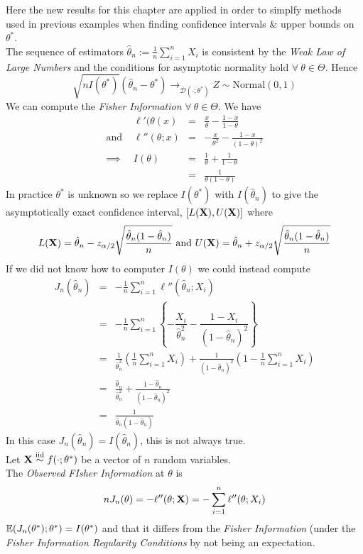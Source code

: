 \documentclass[11pt,a4paper]{article}
\begin{document}
Here the new results for this chapter are applied in order to simplfy methods used in previous examples when finding confidence intervals \& upper bounds on $\theta^*$.\\
The sequence of estimators $\hat{\theta}_n:=\frac{1}{n}\sum_{i=1}^nX_i$ is consistent by the \textit{Weak Law of Large Numbers} and the conditions for asymptotic normality hold $\forall\ \theta\in\Theta$. Hence
$$\sqrt{nI(\theta^*)}(\hat{\theta}_n-\theta^*)\to_{\mathcal{D}(\cdot;\theta^*)}Z\sim\text{Normal}(0,1)$$
We can compute the \textit{Fisher Information} $\forall\ \theta\in\Theta$. We have
\[\begin{array}{rrcl}
&\ell'(\theta(x)&=&\frac{x}{\theta}-\frac{1-x}{1-\theta}\\
\text{and }&\ell''(\theta;x)&=&-\frac{x}{\theta^2}-\frac{1-x}{(1-\theta)^2}\\
\implies&I(\theta)&=&\frac{1}{\theta}+\frac{1}{1-\theta}\\
&&=&\frac{1}{\theta(1-\theta)}
\end{array}\]
In practice $\theta^*$ is unknown so we replace $I(\theta^*)$ with $I(\hat{\theta}_n)$ to give the asymptotically exact confidence interval, $[L(\textbf{X}),U(\textbf{X})]$ where
$$L(\textbf{X})=\hat{\theta}_n-z_{\alpha/2}\sqrt{\frac{\hat{\theta}_n(1-\hat{\theta}_n)}{n}}\text{ and }U(\textbf{X})=\hat{\theta}_n+z_{\alpha/2}\sqrt{\frac{\hat{\theta}_n(1-\hat{\theta}_n)}{n}}$$
If we did not know how to computer $I(\theta)$ we could instead compute
\[\begin{array}{rcl}
J_n(\hat{\theta}_n)&=&-\frac{1}{n}\sum\limits_{i=1}^n\ell''(\hat\theta_n;X_i)\\
&=&-\frac{1}{n}\sum\limits_{i=1}^n\left\{-\dfrac{X_i}{\hat\theta_n^2}-\dfrac{1-X_i}{(1-\hat\theta_n)^2}\right\}\\
&=&\frac{1}{\hat\theta_n^2}\left(\frac{1}{n}\sum\limits_{i=1}^nX_i\right)+\frac{1}{(1-\hat\theta_n)^2}\left(1-\frac{1}{n}\sum\limits_{i=1}^nX_i\right)\\
&=&\frac{\hat\theta_n}{\hat\theta_n^2}+\frac{1-\hat\theta_n}{(1-\hat\theta_n)^2}\\
&=&\frac{1}{\hat\theta_n(1-\hat\theta_n)}
\end{array}\]
In this case $J_n(\hat\theta_n)=I(\hat\theta_n)$, this is not always true.\\

Let $\textbf{X}\overset{\text{iid}}{\sim} f(\cdot;\theta^*)$ be a vector of $n$ random variables.\\
The \textit{Observed FIsher Information} at $\theta$ is
$$nJ_n(\theta)=-\ell''(\theta;\textbf{X})=-\sum\limits_{i=1}^n\ell''(\theta;X_i)$$
\nb $\mathbb{E}(J_n(\theta^*);\theta^*)=I(\theta^*)$ and that it differs from the \textit{Fisher Information} (under the \textit{Fisher Information Regularity Conditions} by not being an expectation.
\end{document}
